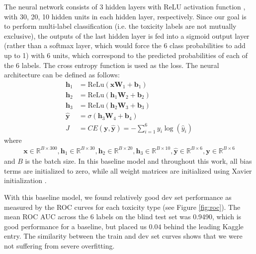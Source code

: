 \documentclass{article} %
\begin{document}
The neural network consists of 3 hidden layers with ReLU activation function \cite{relu}, with 30, 20, 10 hidden units in each hidden layer, respectively. Since our goal is to perform multi-label classification (i.e. the toxicity labels are not mutually exclusive), the outputs of the last hidden layer is fed into a sigmoid output layer (rather than a softmax layer, which would force the 6 class probabilities to add up to 1) with 6 units, which correspond to the predicted probabilities of each of the 6 labels. The cross entropy function is used as the loss. The neural architecture can be defined as follows:
\begin{align*}
	\bm{h}_1 &= \text{ReLu}(\bm{x} \bm{W}_1 + \bm{b}_1) \\
    \bm{h}_2 &= \text{ReLu}(\bm{h}_1  \bm{W}_2 + \bm{b}_2) \\
    \bm{h}_3 &= \text{ReLu}(\bm{h}_2  \bm{W}_3 + \bm{b}_3) \\
    \bm{\hat{y}} &= \sigma(\bm{h}_3  \bm{W}_4 + \bm{b}_4) \\
    J &= CE(\bm{y}, \bm{\hat{y}}) = - \sum_{i=1}^6 y_i \log(\hat{y}_i)
\end{align*}
where
\begin{align*}
	\bm{x} \in \mathbb{R}^{B \times 300},
    \bm{h}_1 \in \mathbb{R}^{B \times 30},
    \bm{h}_2 \in \mathbb{R}^{B \times 20}, 
    \bm{h}_3 \in \mathbb{R}^{B \times 10}, 
    \bm{\hat{y}} \in \mathbb{R}^{B \times 6},
    \bm{y} \in \mathbb{R}^{B \times 6}
\end{align*}
and $B$ is the batch size. In this baseline model and throughout this work, all bias terms are initialized to zero, while all weight matrices are initialized using Xavier initialization \cite{xavier}.

With this baseline model, we found relatively good dev set performance as measured by the ROC curves for each toxicity type (see Figure \ref{fig:roc}). The mean ROC AUC across the 6 labels on the blind test set was 0.9490, which is good performance for a baseline, but placed us $0.04$ behind the leading Kaggle entry. The similarity between the train and dev set curves shows that we were not suffering from severe overfitting.
    
\end{document}
